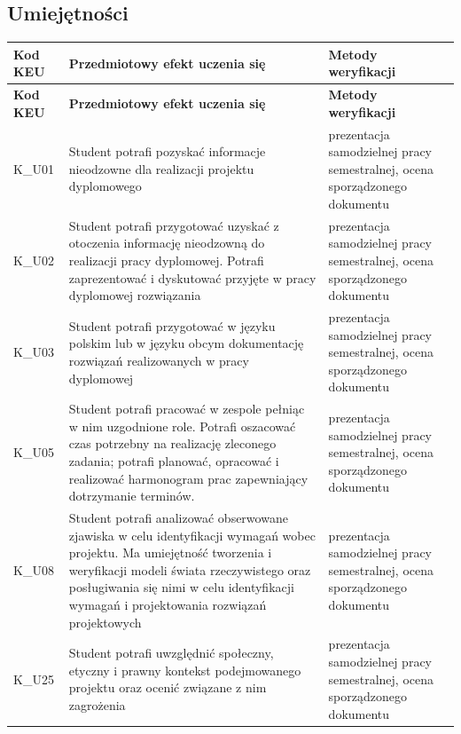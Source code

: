 \documentclass[12pt, a4paper]{article}
\newcommand{\thdrule}{\noalign{\global\setlength{\extrarowheight}{0pt}}}
\newcommand{\thdend}{\noalign{\global\setlength{\extrarowheight}{3pt}}}
\begin{document}
\subsection*{Umiejętności}
{\scriptsize
\begin{longtable}{m{1.6cm}m{9.0cm}m{4.2cm}}
\thdrule\toprule
\rowcolor{pjatkRed} {\color{white}\footnotesize\textbf{\vphantom{Ag}Kod KEU}} & {\color{white}\footnotesize\textbf{\vphantom{Ag}Przedmiotowy efekt uczenia się}} & {\color{white}\footnotesize\textbf{\vphantom{Ag}Metody weryfikacji}} \\
\midrule\thdend
\endfirsthead
\thdrule\toprule
\rowcolor{pjatkRed} {\color{white}\footnotesize\textbf{\vphantom{Ag}Kod KEU}} & {\color{white}\footnotesize\textbf{\vphantom{Ag}Przedmiotowy efekt uczenia się}} & {\color{white}\footnotesize\textbf{\vphantom{Ag}Metody weryfikacji}} \\
\midrule\thdend
\endhead
  \rowcolor{tableRowLight} K\_U01 & Student potrafi  pozyskać informacje nieodzowne dla realizacji projektu dyplomowego & prezentacja samodzielnej pracy semestralnej, ocena sporządzonego dokumentu \\
  \rowcolor{tableRowAlt} K\_U02 & Student potrafi  przygotować uzyskać z otoczenia informację nieodzowną do realizacji pracy dyplomowej.  Potrafi zaprezentować i dyskutować przyjęte w pracy dyplomowej rozwiązania & prezentacja samodzielnej pracy semestralnej, ocena sporządzonego dokumentu \\
  \rowcolor{tableRowLight} K\_U03 & Student potrafi  przygotować w języku polskim lub w języku obcym dokumentację rozwiązań realizowanych w pracy dyplomowej & prezentacja samodzielnej pracy semestralnej, ocena sporządzonego dokumentu \\
  \rowcolor{tableRowAlt} K\_U05 & Student potrafi  pracować w zespole pełniąc w nim uzgodnione role.  Potrafi oszacować czas potrzebny na realizację zleconego zadania; potrafi planować, opracować i realizować harmonogram prac zapewniający dotrzymanie terminów. & prezentacja samodzielnej pracy semestralnej, ocena sporządzonego dokumentu \\
  \rowcolor{tableRowLight} K\_U08 & Student potrafi   analizować obserwowane zjawiska w celu identyfikacji wymagań wobec projektu.  Ma umiejętność tworzenia i weryfikacji modeli świata rzeczywistego oraz posługiwania się nimi w celu identyfikacji wymagań i projektowania rozwiązań projektowych & prezentacja samodzielnej pracy semestralnej, ocena sporządzonego dokumentu \\
  \rowcolor{tableRowAlt} K\_U25 & Student potrafi   uwzględnić społeczny, etyczny i prawny kontekst podejmowanego projektu oraz ocenić związane z nim zagrożenia & prezentacja samodzielnej pracy semestralnej, ocena sporządzonego dokumentu \\

\end{longtable}}
\end{document}
